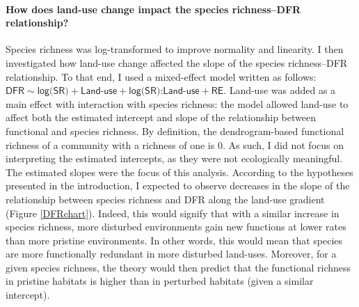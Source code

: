 \paragraph{How does land-use change impact the species richness--DFR relationship?}
Species richness was log-transformed to improve normality and linearity. I then investigated how land-use change affected the slope of the species richness--DFR relationship.  To that end, I used a mixed-effect model written as follows:  
$\textsf{DFR} \sim \textsf{log(SR)} + \textsf{Land-use} + \textsf{log(SR):Land-use} + \textsf{RE}$. Land-use was added as a main effect with interaction with species richness: the model allowed land-use to affect both the estimated intercept and slope of the relationship between functional and species richness. By definition, the dendrogram-based functional richness of a community with a richness of one is 0. As such, I did not focus on interpreting the estimated intercepts, as they were not ecologically meaningful. 
The estimated slopes were the focus of this analysis. According to the hypotheses presented in the introduction, I expected to observe decreases in the slope of the relationship between species richness and DFR along the land-use gradient (Figure \ref{DFRchart}). Indeed, this would signify that with a similar increase in species richness, more disturbed environments gain new functions at lower rates than more pristine environments. In other words, this would mean that species are more functionally redundant in more disturbed land-uses. Moreover, for a given species richness, the theory would then predict that the functional richness in pristine habitats is higher than in perturbed habitats (given a similar intercept).

